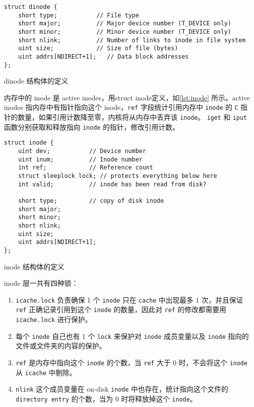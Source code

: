\begin{listing}[!htb]
	\begin{verbatim}
struct dinode {
    short type;           // File type
    short major;          // Major device number (T_DEVICE only)
    short minor;          // Minor device number (T_DEVICE only)
    short nlink;          // Number of links to inode in file system
    uint size;            // Size of file (bytes)
    uint addrs[NDIRECT+1];   // Data block addresses
};
	\end{verbatim}
	\caption{dinode 结构体的定义}\label{lst:dinode}
\end{listing}


内存中的 inode 是 active inodes，用struct inode定义，如\cref{lst:inode} 所示。active inodes 指内存中有指针指向这个 inode，\texttt{ref} 字段统计引用内存中 \texttt{inode} 的 \texttt{C} 指针的数量，如果引用计数降至零，内核将从内存中丢弃该 \texttt{inode}。 \texttt{iget} 和 \texttt{iput} 函数分别获取和释放指向 \texttt{inode} 的指针，修改引用计数。

\begin{listing}[!htb]
	\begin{verbatim}
struct inode {
    uint dev;           // Device number
    uint inum;          // Inode number
    int ref;            // Reference count
    struct sleeplock lock; // protects everything below here
    int valid;          // inode has been read from disk?
    
    short type;         // copy of disk inode
    short major;
    short minor;
    short nlink;
    uint size;
    uint addrs[NDIRECT+1];
};
	\end{verbatim}
	\caption{inode 结构体的定义}\label{lst:inode}
\end{listing}

inode 层一共有四种锁：

\begin{enumerate}
	\item \texttt{icache.lock} 负责确保 1 个 \texttt{inode} 只在 \texttt{cache} 中出现最多 1 次，并且保证 \texttt{ref} 正确记录引用到这个 \texttt{inode} 的数量，因此对 \texttt{ref} 的修改都需要用 \texttt{icache.lock} 进行保护。
	\item 每个 \texttt{inode} 自己也有 1 个 \texttt{lock} 来保护对 \texttt{inode} 成员变量以及 \texttt{inode} 指向的文件或文件夹的内容的保护。
	\item \texttt{ref} 是内存中指向这个 \texttt{inode} 的个数，当 \texttt{ref} 大于 0 时，不会将这个 \texttt{inode} 从 \texttt{icache} 中剔除。
	\item \texttt{nlink} 这个成员变量在 on-disk \texttt{inode} 中也存在，统计指向这个文件的 \texttt{directory entry} 的个数，当为 0 时将释放掉这个 \texttt{inode}。
\end{enumerate}


